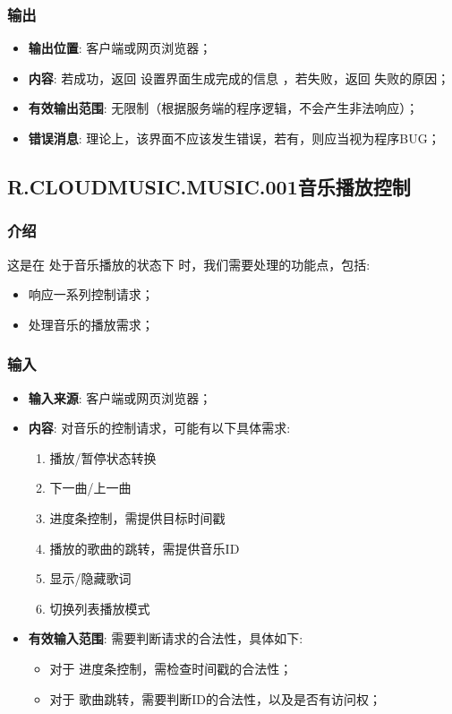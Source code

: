 \begin{enumerate}
\subsubsection{输出}
\begin{itemize}
	\item \textbf{输出位置}: 客户端或网页浏览器；
	\item \textbf{内容}: 若成功，返回 设置界面生成完成的信息 ，若失败，返回 失败的原因；
	\item \textbf{有效输出范围}: 无限制（根据服务端的程序逻辑，不会产生非法响应）；
	\item \textbf{错误消息}: 理论上，该界面不应该发生错误，若有，则应当视为程序BUG；
\end{itemize}

\subsection{R.CLOUDMUSIC.MUSIC.001音乐播放控制}
\subsubsection{介绍}
	这是在 处于音乐播放的状态下 时，我们需要处理的功能点，包括: 
	\begin{itemize}
		\item 响应一系列控制请求；
		\item 处理音乐的播放需求；
	\end{itemize}
\subsubsection{输入}
	\begin{itemize}
		\item \textbf{输入来源}: 客户端或网页浏览器；
		\item \textbf{内容}: 对音乐的控制请求，可能有以下具体需求: 
		\begin{enumerate}
			\item 播放/暂停状态转换
			\item 下一曲/上一曲
			\item 进度条控制，需提供目标时间戳
			\item 播放的歌曲的跳转，需提供音乐ID
			\item 显示/隐藏歌词
			\item 切换列表播放模式
		\end{enumerate}
		\item \textbf{有效输入范围}: 需要判断请求的合法性，具体如下: 
		\begin{itemize}
			\item 对于 进度条控制，需检查时间戳的合法性；
			\item 对于 歌曲跳转，需要判断ID的合法性，以及是否有访问权； 
		\end{itemize}
	\end{itemize}

\end{enumerate}

